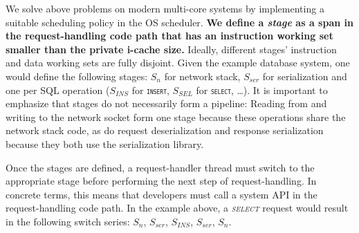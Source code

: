 \documentclass[12pt,a4paper]{book}
\begin{document}
We solve above problems on modern multi-core systems by implementing a suitable scheduling policy in the OS scheduler.
\textbf{We define a \emph{stage} as a span in the request-handling code path that has an instruction working set smaller than the private i-cache size.}
Ideally, different stages' instruction and data working sets are fully disjoint.
Given the example database system, one would define the following stages:
$S_n$ for network stack, $S_{ser}$ for serialization and one per SQL operation ($S_{INS}$ for \texttt{\textsc{insert}}, $S_{SEL}$ for \texttt{\textsc{select}}, \dots).
It is important to emphasize that stages do not necessarily form a pipeline:
Reading from and writing to the network socket form one stage because these operations share the network stack code, as do request deserialization and response serialization because they both use the serialization library.

Once the stages are defined, a request-handler thread must switch to the appropriate stage before performing the next step of request-handling.
In concrete terms, this means that developers must call a system API in the request-handling code path.
In the example above, a \textit{\textsc{select}} request would result in the following switch series: $S_n$, $S_{ser}$, $S_{INS}$, $S_{ser}$, $S_n$.

\end{document}

